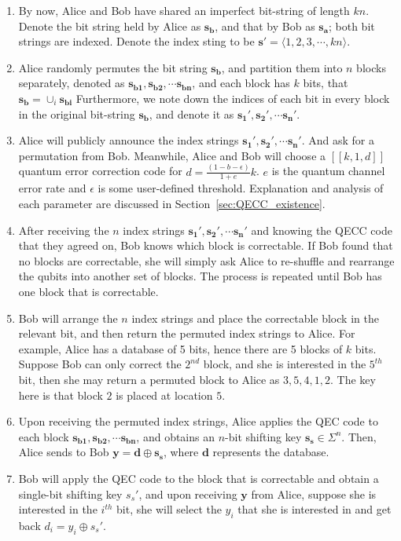 \documentclass[%
 reprint,
superscriptaddress,
 amsmath,amssymb,
 aps,
]{revtex4-2}
\begin{document}
\begin{enumerate}
    \item By now, Alice and Bob have shared an imperfect bit-string of length $kn$. Denote the bit string held by Alice as $\mathbf{s_b}$, and that by Bob as $\mathbf{s_a}$; both bit strings are indexed. Denote the index sting to be $\mathbf{s'}=\langle1, 2, 3, \cdots, kn\rangle$.

    \item Alice randomly permutes the bit string $\mathbf{s_b}$, and partition them into $n$ blocks separately, denoted as $\mathbf{s_{b1}}, \mathbf{s_{b2}},\cdots \mathbf{s_{bn}}$, and each block has $k$ bits, that $\mathbf{s_b}=\cup_i \mathbf{s_{bi}}$ Furthermore, we note down the indices of each bit in every block in the original bit-string $\mathbf{s_b}$, and denote it as $\mathbf{s_{1}'}, \mathbf{s_{2}'},\cdots \mathbf{s_{n}'}$.

    \item Alice will publicly announce the index strings $\mathbf{s_1'}, \mathbf{s_2'},\cdots \mathbf{s_n'}$. And ask for a permutation from Bob. Meanwhile, Alice and Bob will choose a $[[k, 1, d]]$ quantum error correction code for $d=\frac{(1-b-\epsilon)}{1+e}k$. $e$ is the quantum channel error rate and $\epsilon$ is some user-defined threshold. Explanation and analysis of each parameter are discussed in Section~\ref{sec:QECC_existence}.

    \item After receiving the $n$ index strings $\mathbf{s_1'}, \mathbf{s_2'},\cdots \mathbf{s_n'}$ and knowing the QECC code that they agreed on, Bob knows which block is correctable. If Bob found that no blocks are correctable, she will simply ask Alice to re-shuffle and rearrange the qubits into another set of blocks. The process is repeated until Bob has one block that is correctable. 
    
    \item Bob will arrange the $n$ index strings and place the correctable block in the relevant bit, and then return the permuted index strings to Alice. For example, Alice has a database of 5 bits, hence there are 5 blocks of $k$ bits. Suppose Bob can only correct the $2^{nd}$ block, and she is interested in the $5^{th}$ bit, then she may return a permuted block to Alice as $3, 5, 4, 1, 2$. The key here is that block $2$ is placed at location $5$. 

    \item Upon receiving the permuted index strings, Alice applies the QEC code to each block $\mathbf{s_{b1}}, \mathbf{s_{b2}},\cdots \mathbf{s_{bn}}$, and obtains an $n$-bit shifting key $\mathbf{s_s}\in\Sigma^n$. Then, Alice sends to Bob $\mathbf{y}=\mathbf{d}\oplus\mathbf{s_s}$, where $\mathbf{d}$ represents the database.

    \item Bob will apply the QEC code to the block that is correctable and obtain a single-bit shifting key $s_s'$, and upon receiving $\mathbf{y}$ from Alice, suppose she is interested in the $i^{th}$ bit, she will select the $y_i$ that she is interested in and get back $d_i=y_i\oplus s_s'$.
    
\end{enumerate}
\end{document}
